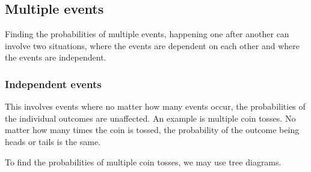 \documentclass{article}
\begin{document}
\subsection*{Multiple events}

Finding the probabilities of multiple events, happening one after another can involve two 
situations, where the events are dependent on each other and where the events are independent.

\subsubsection*{Independent events}

This involves events where no matter how many events occur, the probabilities of the individual
outcomes are unaffected. An example is multiple coin tosses. No matter how many times the coin is
tossed, the probability of the outcome being heads or tails is the same. 

To find the probabilities of multiple coin tosses, we may use tree diagrams.
\end{document}
